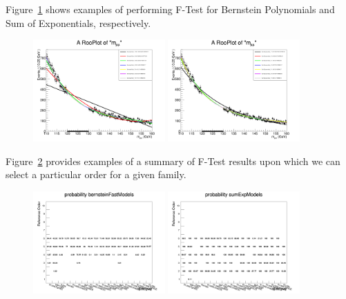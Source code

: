 Figure~\ref{fig:higgs_backgroundmodel_ftestexample} shows examples of performing F-Test for Bernstein Polynomials and Sum of Exponentials, respectively.

\begin{figure}[hbp]
     \centering
     \includegraphics[width=0.45\textwidth]{figures/ch_higgs/ftest/baseline_110to160_p25GeV/ftest__01JetsTightBB__bernsteinFastModels.png}
     \includegraphics[width=0.45\textwidth]{figures/ch_higgs/ftest/baseline_110to160_p25GeV/ftest__01JetsTightBB__sumExpModels.png}
     \caption{}
     \label{fig:higgs_backgroundmodel_ftestexample}
 \end{figure}

 Figure~\ref{fig:higgs_backgroundmodel_ftestresults} provides examples of a summary of F-Test results upon which we can select a particular order for a given family.

 \begin{figure}[hbp]
     \centering
     \includegraphics[width=0.45\textwidth]{figures/ch_higgs/ftest/baseline_110to160_p25GeV/ftestresults__probability__bernsteinFastModels.png}
     \includegraphics[width=0.45\textwidth]{figures/ch_higgs/ftest/baseline_110to160_p25GeV/ftestresults__probability__sumExpModels.png}
     \caption{}
     \label{fig:higgs_backgroundmodel_ftestresults}
 \end{figure}

